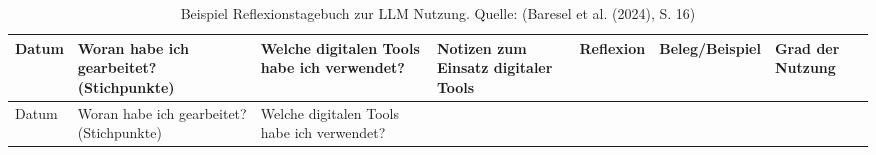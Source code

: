\documentclass[
  ngerman,
  letterpaper,
  DIV=11]{scrreprt}
\begin{document}
\begin{longtable}[]{@{}
  >{\raggedright\arraybackslash}p{}
  >{\raggedright\arraybackslash}p{}
  >{\raggedright\arraybackslash}p{}
  >{\raggedright\arraybackslash}p{}
  >{\raggedright\arraybackslash}p{}
  >{\raggedright\arraybackslash}p{}
  >{\raggedright\arraybackslash}p{}@{}}
\caption{Beispiel Reflexionstagebuch zur LLM Nutzung. Quelle: (Baresel
et al. (2024), S. 16)}\label{tbl-doc-reflection}\tabularnewline
\toprule\noalign{}
\begin{minipage}[b]{\linewidth}\raggedright
Datum
\end{minipage} & \begin{minipage}[b]{\linewidth}\raggedright
Woran habe ich gearbeitet? (Stichpunkte)
\end{minipage} & \begin{minipage}[b]{\linewidth}\raggedright
Welche digitalen Tools habe ich verwendet?
\end{minipage} & \begin{minipage}[b]{\linewidth}\raggedright
Notizen zum Einsatz digitaler Tools
\end{minipage} & \begin{minipage}[b]{\linewidth}\raggedright
Reflexion
\end{minipage} & \begin{minipage}[b]{\linewidth}\raggedright
Beleg/Beispiel
\end{minipage} & \begin{minipage}[b]{\linewidth}\raggedright
Grad der Nutzung
\end{minipage} \\
\midrule\noalign{}
\endfirsthead
\toprule\noalign{}
\begin{minipage}[b]{\linewidth}\raggedright
Datum
\end{minipage} & \begin{minipage}[b]{\linewidth}\raggedright
Woran habe ich gearbeitet? (Stichpunkte)
\end{minipage} & \begin{minipage}[b]{\linewidth}\raggedright
Welche digitalen Tools habe ich verwendet?
\end{minipage} & \begin{minipage}[b]{\linewidth}\raggedright

\end{minipage}
\end{longtable}
\end{document}
